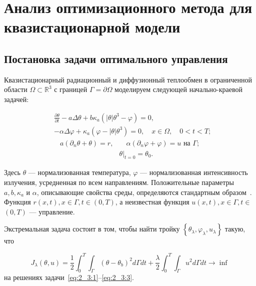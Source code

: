 \section{Анализ оптимизационного метода для квазистационарной модели}
\label{sec:ch2/sec3}

\subsection{Постановка задачи оптимального управления}
\label{subsec:ch2/sec3/state}
Квазистационарный радиационный и диффузионный теплообмен в ограниченной области
$\Omega \subset \mathbb{R}^{3}$ с границей $\Gamma=\partial \Omega$ моделируем
следующей начально-краевой задачей:

\begin{equation}
    \label{eq:2_3:1}
    \begin{split}
        & \frac{\partial \theta}{\partial t} - a \Delta \theta
        + b \kappa_{a} \left(|\theta| \theta^{3}-\varphi\right) = 0,\\
        & - \alpha \Delta \varphi
        + \kappa_{a} \left(\varphi-|\theta| \theta^{3}\right) = 0,
        \quad x \in \Omega, \quad 0 < t < T;
    \end{split}
\end{equation}
\begin{align}
    a \left(\partial_{n} \theta+\theta\right)=r,
    & \quad \alpha\left(\partial_{n} \varphi
    + \varphi\right) = u \text { на } \Gamma;  \label{eq:2_3:2}\\
    & \left.\theta\right|_{t=0} = \theta_{0}. \label{eq:2_3:3}
\end{align}

Здесь $\theta$ — нормализованная температура,
$\varphi$ — нормализованная интенсивность излучения,
усредненная по всем направлениям.
Положительные параметры $a, b, \kappa_{a}$ и $\alpha$,
описывающие свойства среды,
определяются стандартным образом~\cite{Kovtanyuk2015}.
Функция $r(x, t), x \in \Gamma, t \in(0, T)$,
а неизвестная функция $u(x, t), x \in \Gamma, t \in$ $(0, T)$ — управление.


Экстремальная задача состоит в том, чтобы найти тройку
$\left\{\theta_{\lambda}, \varphi_{\lambda}, u_{\lambda}\right\}$ такую, что

\begin{equation}
    \label{eq:2_3:4}
    J_{\lambda}(\theta, u)=\frac{1}{2} \int_{0}^{T}
    \int_{\Gamma}\left(\theta-\theta_{b}\right)^{2} d \Gamma d t+\frac{\lambda}{2}
    \int_{0}^{T} \int_{\Gamma} u^{2} d \Gamma d t \rightarrow \inf
\end{equation}
на решениях задачи~\eqref{eq:2_3:1}--\eqref{eq:2_3:3}.

